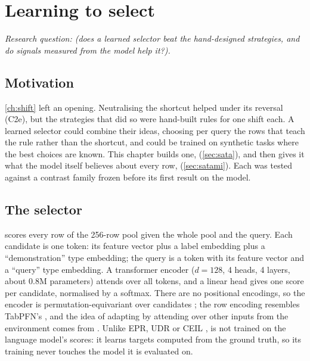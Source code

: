 \chapter{Learning to select}
\label{ch:sata}

\emph{Research question:  (does a learned selector beat the hand-designed strategies, and do signals measured from the model help it?).}

\section{Motivation}

\autoref{ch:shift} left an opening.
Neutralising the shortcut helped under its reversal (C2e), but the strategies that did so were hand-built rules for one shift each.
A learned selector could combine their ideas, choosing per query the rows that teach the rule rather than the shortcut, and could be trained on synthetic tasks where the best choices are known.
This chapter builds one, \sata (\autoref{sec:sata}), and then gives it what the model itself believes about every row, \satami (\autoref{sec:satami}).
Each was tested against a contrast family frozen before its first result on the model.

\section{The selector}
\label{sec:sata-arch}

\sata scores every row of the 256-row pool given the whole pool and the query.
Each candidate is one token: its feature vector plus a label embedding plus a ``demonstration'' type embedding; the query is a token with its feature vector and a ``query'' type embedding.
A transformer encoder ($d = 128$, 4 heads, 4 layers, about 0.8M parameters) attends over all tokens, and a linear head gives one score per candidate, normalised by a softmax.
There are no positional encodings, so the encoder is permutation-equivariant over candidates \citep{lee2019set}; the row encoding resembles TabPFN's \citep{hollmann2023tabpfn}, and the idea of adapting by attending over other inputs from the environment comes from \citet{gupta2024context}.
Unlike EPR, UDR or CEIL \citep{rubin2022learning,li2023unified,ye2023compositional}, \sata is not trained on the language model's scores: it learns targets computed from the ground truth, so its training never touches the model it is evaluated on.

